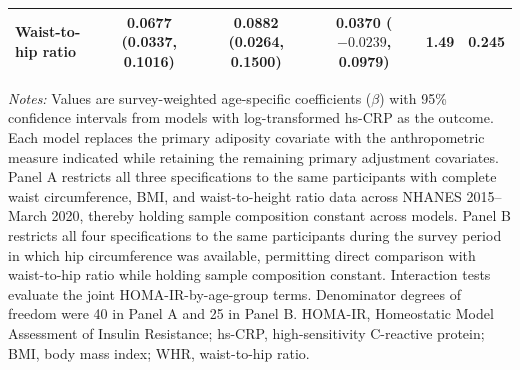 \begin{landscape}
\begin{table}[htbp]
\begin{tabular}{lccccc}
Waist-to-hip ratio &
0.0677 (0.0337, 0.1016) &
0.0882 (0.0264, 0.1500) &
0.0370 ($-0.0239$, 0.0979) &
1.49 &
0.245 \\

\hline
\end{tabular}

\vspace{0.6em}

\begin{minipage}{0.96\linewidth}
\footnotesize
\textit{Notes:} Values are survey-weighted age-specific coefficients
($\beta$) with 95\% confidence intervals from models with log-transformed
hs-CRP as the outcome. Each model replaces the primary adiposity covariate
with the anthropometric measure indicated while retaining the remaining
primary adjustment covariates. Panel A restricts all three specifications
to the same participants with complete waist circumference, BMI, and
waist-to-height ratio data across NHANES 2015--March 2020, thereby holding
sample composition constant across models. Panel B restricts all four
specifications to the same participants during the survey period in which
hip circumference was available, permitting direct comparison with
waist-to-hip ratio while holding sample composition constant. Interaction
tests evaluate the joint HOMA-IR-by-age-group terms. Denominator degrees
of freedom were 40 in Panel A and 25 in Panel B. HOMA-IR, Homeostatic
Model Assessment of Insulin Resistance; hs-CRP, high-sensitivity
C-reactive protein; BMI, body mass index; WHR, waist-to-hip ratio.
\end{minipage}

\end{table}

\end{landscape}
